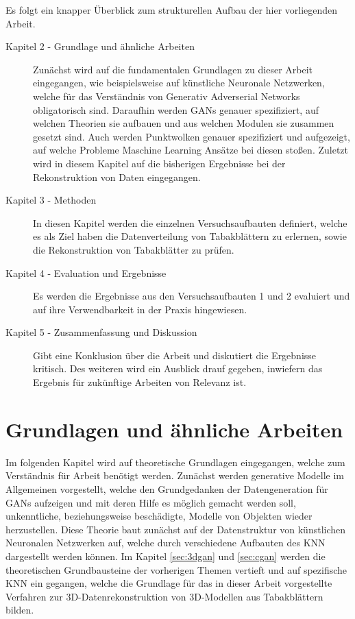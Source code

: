 \documentclass{llncs}
\begin{document}
Es folgt ein knapper Überblick zum strukturellen Aufbau der hier vorliegenden Arbeit.
\\
\begin{description}
\item[Kapitel 2 - Grundlage und ähnliche Arbeiten] Zunächst wird auf die fundamentalen Grundlagen zu dieser Arbeit eingegangen, wie beispielsweise auf künstliche Neuronale Netzwerken, welche für das Verständnis von Generativ Adverserial Networks obligatorisch sind. Daraufhin werden GANs genauer spezifiziert, auf welchen Theorien sie aufbauen und aus welchen Modulen sie zusammen gesetzt sind. Auch werden Punktwolken genauer spezifiziert und aufgezeigt, auf welche Probleme Maschine Learning Ansätze bei diesen stoßen. Zuletzt wird in diesem Kapitel auf die bisherigen Ergebnisse bei der Rekonstruktion von Daten eingegangen.\\
\item[Kapitel 3 - Methoden] In diesen Kapitel werden die einzelnen Versuchsaufbauten definiert, welche es als Ziel haben die Datenverteilung von Tabakblättern zu erlernen, sowie die Rekonstruktion von Tabakblätter zu prüfen.\\
\item[Kapitel 4 - Evaluation und Ergebnisse] Es werden die Ergebnisse aus den Versuchsaufbauten 1 und 2 evaluiert und auf ihre Verwendbarkeit in der Praxis hingewiesen.\\
\item[Kapitel 5 - Zusammenfassung und Diskussion] Gibt eine Konklusion über die Arbeit und diskutiert die Ergebnisse kritisch. Des weiteren wird ein Ausblick drauf gegeben, inwiefern das Ergebnis für zukünftige Arbeiten von Relevanz ist. 
\end{description}
\newpage
\section{Grundlagen und ähnliche Arbeiten}

Im folgenden Kapitel wird auf theoretische Grundlagen eingegangen, welche zum Verständnis für Arbeit benötigt werden. Zunächst werden generative Modelle im Allgemeinen vorgestellt, welche den Grundgedanken der Datengeneration für GANs aufzeigen und mit deren Hilfe es möglich gemacht werden soll, unkenntliche, beziehungsweise beschädigte, Modelle von Objekten wieder herzustellen. Diese Theorie baut zunächst auf der Datenstruktur von künstlichen Neuronalen Netzwerken auf, welche durch verschiedene Aufbauten des KNN dargestellt werden können. Im Kapitel \ref{sec:3dgan} und \ref{sec:cgan} werden die theoretischen Grundbausteine der vorherigen Themen vertieft und auf spezifische KNN ein gegangen, welche die Grundlage für das in dieser Arbeit vorgestellte Verfahren zur 3D-Datenrekonstruktion von 3D-Modellen aus Tabakblättern bilden. 
\end{document}
